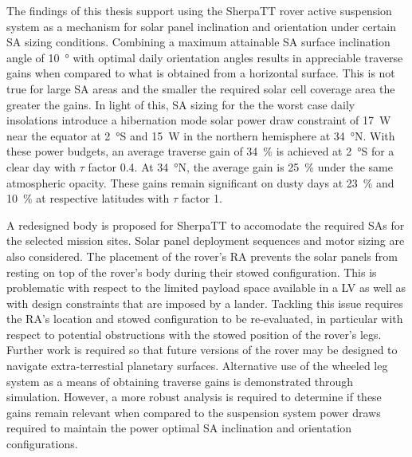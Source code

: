 The findings of this thesis support using the SherpaTT rover active suspension system as a mechanism for solar panel inclination and orientation under certain \ac{SA} sizing conditions. Combining a maximum attainable \ac{SA} surface inclination angle of \SI{10}{\degree} with optimal daily orientation angles results in appreciable traverse gains when compared to what is obtained from a horizontal surface. This is not true for large \ac{SA} areas and the smaller the required solar cell coverage area the greater the gains. In light of this, \ac{SA} sizing for the the worst case daily insolations introduce a hibernation mode solar power draw constraint of \SI{17}{\watt} near the equator at \SI{2}{\degree}S and \SI{15}{\watt} in the northern hemisphere at \SI{34}{\degree}N. With these power budgets, an average traverse gain of \SI{34}{\percent} is achieved at \SI{2}{\degree}S for a clear day with $\tau$ factor 0.4. At \SI{34}{\degree}N, the average gain is \SI{25}{\percent} under the same atmospheric opacity. These gains remain significant on dusty days at \SI{23}{\percent} and \SI{10}{\percent} at respective latitudes with $\tau$ factor 1.

A redesigned body is proposed for SherpaTT to accomodate the required \acp{SA} for the selected mission sites. Solar panel deployment sequences and motor sizing are also considered. The placement of the rover's \ac{RA} prevents the solar panels from resting on top of the rover's body during their stowed configuration. This is problematic with respect to the limited payload space available in a \ac{LV} as well as with design constraints that are imposed by a lander. Tackling this issue requires the \ac{RA}'s location and stowed configuration to be re-evaluated, in particular with respect to potential obstructions with the stowed position of the rover's legs. Further work is required so that future versions of the rover may be designed to navigate extra-terrestial planetary surfaces. Alternative use of the wheeled leg system as a means of obtaining traverse gains is demonstrated through simulation. However, a more robust analysis is required to determine if these gains remain relevant when compared to the suspension system power draws required to maintain the power optimal \ac{SA} inclination and orientation configurations.

